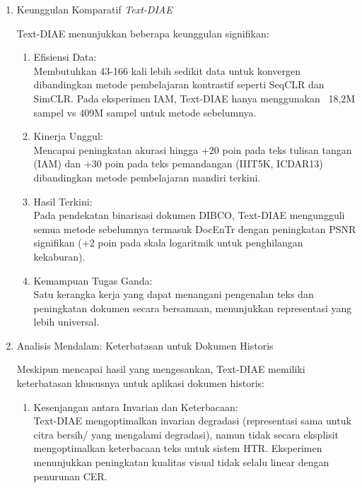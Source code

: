 \documentclass[12pt,a4paper]{article}
\begin{document}
\begin{enumerate}[leftmargin=*, labelsep=0.5em, itemindent=0pt, label=\arabic*., topsep=0pt, partopsep=0pt]
\item Keunggulan Komparatif \textit{Text-DIAE}
\label{para:textdiae-keunggulan}

Text-DIAE menunjukkan beberapa keunggulan signifikan:

\begin{enumerate}[leftmargin=1.5em, labelsep=0.5em, itemindent=0pt, label=\alph*., topsep=0pt, parsep=0pt, itemsep=0pt]
      \item Efisiensi Data: \mbox{}\\[0.1em]
            Membutuhkan 43-166 kali lebih sedikit data untuk konvergen dibandingkan metode pembelajaran kontrastif seperti SeqCLR dan SimCLR. Pada eksperimen IAM, Text-DIAE hanya menggunakan ~18,2M sampel vs 409M sampel untuk metode sebelumnya.

      \item Kinerja Unggul: \mbox{}\\[0.1em]
            Mencapai peningkatan akurasi hingga +20 poin pada teks tulisan tangan (IAM) dan +30 poin pada teks pemandangan (IIIT5K, ICDAR13) dibandingkan metode pembelajaran mandiri terkini.

      \item Hasil Terkini: \mbox{}\\[0.1em]
            Pada pendekatan binarisasi dokumen DIBCO, Text-DIAE mengungguli semua metode sebelumnya termasuk DocEnTr dengan peningkatan PSNR signifikan (+2 poin pada skala logaritmik untuk penghilangan kekaburan).

      \item Kemampuan Tugas Ganda: \mbox{}\\[0.1em]
            Satu kerangka kerja yang dapat menangani pengenalan teks dan peningkatan dokumen secara bersamaan, menunjukkan representasi yang lebih universal.
\end{enumerate}

\item Analisis Mendalam: Keterbatasan untuk Dokumen Historis

Meskipun mencapai hasil yang mengesankan, Text-DIAE memiliki keterbatasan khususnya untuk aplikasi dokumen historis:

\begin{enumerate}[leftmargin=1.5em, labelsep=0.5em, itemindent=0pt, label=\alph*., topsep=0pt, parsep=0pt, itemsep=0pt]
      \item Kesenjangan antara Invarian dan Keterbacaan: \mbox{}\\[0.1em]
            Text-DIAE mengoptimalkan invarian degradasi (representasi sama untuk citra bersih/ yang mengalami degradasi), namun tidak secara eksplisit mengoptimalkan keterbacaan teks untuk sistem HTR. Eksperimen menunjukkan peningkatan kualitas visual tidak selalu linear dengan penurunan CER.


\end{enumerate}
\end{enumerate}
\end{document}
